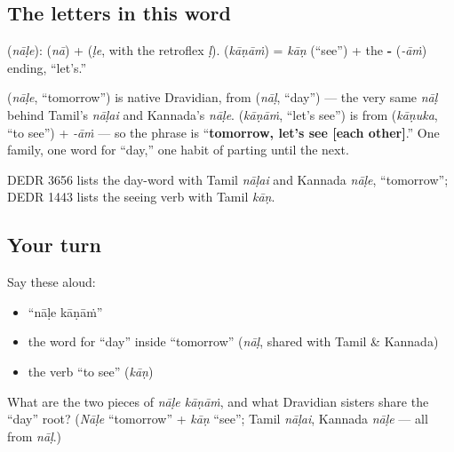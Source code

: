 \subsection*{The letters in this word}
\textbf{} (\emph{nāḷe}): \textbf{} (\emph{nā}) + \textbf{} (\emph{ḷe}, with the retroflex \textbf{} \emph{ḷ}). \textbf{} (\emph{kāṇāṁ}) = \emph{kāṇ} (\textquotedblleft{}see\textquotedblright{}) + the \textbf{-} (\emph{-āṁ}) ending, \textquotedblleft{}let's.\textquotedblright{}

\begin{cousinweb}
\textbf{} (\emph{nāḷe}, \textquotedblleft{}tomorrow\textquotedblright{}) is native Dravidian, from \textbf{} (\emph{nāḷ}, \textquotedblleft{}day\textquotedblright{}) — the very same \emph{nāḷ} behind Tamil's \emph{nāḷai} and Kannada's \emph{nāḷe}. \textbf{} (\emph{kāṇāṁ}, \textquotedblleft{}let's see\textquotedblright{}) is from \textbf{} (\emph{kāṇuka}, \textquotedblleft{}to see\textquotedblright{}) + \emph{-āṁ} — so the phrase is \textquotedblleft{}\textbf{tomorrow, let's see {[}each other{]}}.\textquotedblright{} One family, one word for \textquotedblleft{}day,\textquotedblright{} one habit of parting until the next.

DEDR 3656 lists the day-word with Tamil \emph{nāḷai} and Kannada \emph{nāḷe}, \textquotedblleft{}tomorrow\textquotedblright{}; DEDR 1443 lists the seeing verb with Tamil \emph{kāṇ}.
\end{cousinweb}

\subsection*{Your turn}
Say these aloud:

\begin{itemize}
\raggedright
  \item \textquotedblleft{}nāḷe kāṇāṁ\textquotedblright{}
  \item the word for \textquotedblleft{}day\textquotedblright{} inside \textquotedblleft{}tomorrow\textquotedblright{} (\emph{nāḷ}, shared with Tamil \& Kannada)
  \item the verb \textquotedblleft{}to see\textquotedblright{} (\emph{kāṇ})
\end{itemize}

\begin{tcolorbox}[breakable,colback=teal!4,colframe=teal!35!black,title={Before you move on}]
What are the two pieces of \emph{nāḷe kāṇāṁ}, and what Dravidian sisters share the \textquotedblleft{}day\textquotedblright{} root? (\emph{Nāḷe} \textquotedblleft{}tomorrow\textquotedblright{} + \emph{kāṇ} \textquotedblleft{}see\textquotedblright{}; Tamil \emph{nāḷai}, Kannada \emph{nāḷe} — all from \emph{nāḷ}.)
\end{tcolorbox}
